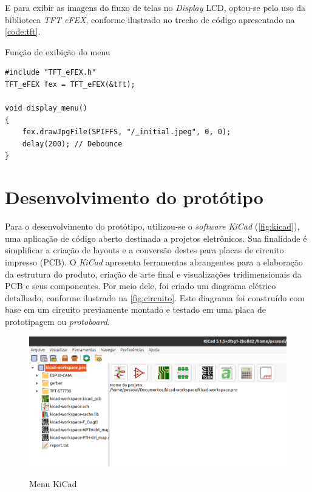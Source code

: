 E para exibir as imagens do fluxo de telas no \textit{Display} 
LCD, optou-se pelo uso da biblioteca \textit{TFT eFEX}, 
conforme ilustrado no trecho de código apresentado 
na \autoref{code:tft}.

\begin{sourcecode}[htb]
\caption{\label{code:tft}Função de exibição do menu}
\begin{lstlisting}[frame=single]
#include "TFT_eFEX.h"
TFT_eFEX fex = TFT_eFEX(&tft);

void display_menu()
{
    fex.drawJpgFile(SPIFFS, "/_initial.jpeg", 0, 0);
    delay(200); // Debounce
} 
\end{lstlisting}
\fonte{}
\end{sourcecode}

\section{Desenvolvimento do protótipo}\label{sec:prototipo}

Para o desenvolvimento do protótipo, utilizou-se o 
\textit{software KiCad} (\autoref{fig:kicad}), uma aplicação de código aberto destinada a 
projetos eletrônicos. Sua finalidade é simplificar a criação 
de layouts e a conversão destes para placas de circuito 
impresso (PCB). O \textit{KiCad} apresenta ferramentas 
abrangentes para a elaboração da estrutura do produto, 
criação de arte final e visualizações tridimensionais da PCB e 
seus componentes. Por meio dele, foi criado um diagrama elétrico  
detalhado, conforme ilustrado na \autoref{fig:circuito}. Este diagrama 
foi construído com base em um circuito previamente montado e testado em 
uma placa de prototipagem ou \textit{protoboard}. 

\begin{figure}[h!]
    \centering
    \caption{Menu KiCad}
    \includegraphics[scale=0.4]{figuras/kicad.png}
    \fonte{}%
    \label{fig:kicad}
    \centering
\end{figure}

